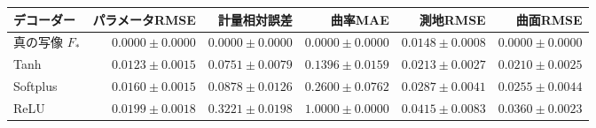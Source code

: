 \begin{tabular}{lrrrrr}
\toprule
デコーダー & パラメータRMSE & 計量相対誤差 & 曲率MAE & 測地RMSE & 曲面RMSE \\
\midrule
真の写像 $F_*$ & $0.0000\pm0.0000$ & $0.0000\pm0.0000$ & $0.0000\pm0.0000$ & $0.0148\pm0.0008$ & $0.0000\pm0.0000$ \\
Tanh & $0.0123\pm0.0015$ & $0.0751\pm0.0079$ & $0.1396\pm0.0159$ & $0.0213\pm0.0027$ & $0.0210\pm0.0025$ \\
Softplus & $0.0160\pm0.0015$ & $0.0878\pm0.0126$ & $0.2600\pm0.0762$ & $0.0287\pm0.0041$ & $0.0255\pm0.0044$ \\
ReLU & $0.0199\pm0.0018$ & $0.3221\pm0.0198$ & $1.0000\pm0.0000$ & $0.0415\pm0.0083$ & $0.0360\pm0.0023$ \\
\bottomrule
\end{tabular}
